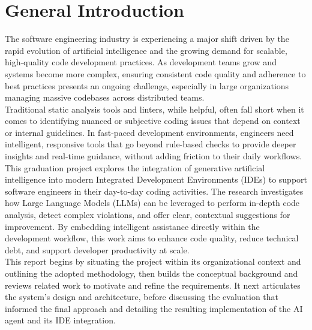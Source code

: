 \chapter*{General Introduction}

\begin{spacing}{1.2}

The software engineering industry is experiencing a major shift driven by the rapid evolution of artificial intelligence and the growing demand for scalable, high-quality code development practices. As development teams grow and systems become more complex, ensuring consistent code quality and adherence to best practices presents an ongoing challenge, especially in large organizations managing massive codebases across distributed teams.\\

Traditional static analysis tools and linters, while helpful, often fall short when it comes to identifying nuanced or subjective coding issues that depend on context or internal guidelines. In fast-paced development environments, engineers need intelligent, responsive tools that go beyond rule-based checks to provide deeper insights and real-time guidance, without adding friction to their daily workflows.\\

This graduation project explores the integration of generative artificial intelligence into modern Integrated Development Environments (IDEs) to support software engineers in their day-to-day coding activities. The research investigates how Large Language Models (LLMs) can be leveraged to perform in-depth code analysis, detect complex violations, and offer clear, contextual suggestions for improvement. By embedding intelligent assistance directly within the development workflow, this work aims to enhance code quality, reduce technical debt, and support developer productivity at scale.\\

This report begins by situating the project within its organizational context and outlining the adopted methodology, then builds the conceptual background and reviews related work to motivate and refine the requirements. It next articulates the system’s design and architecture, before discussing the evaluation that informed the final approach and detailing the resulting implementation of the AI agent and its IDE integration.




\end{spacing}



